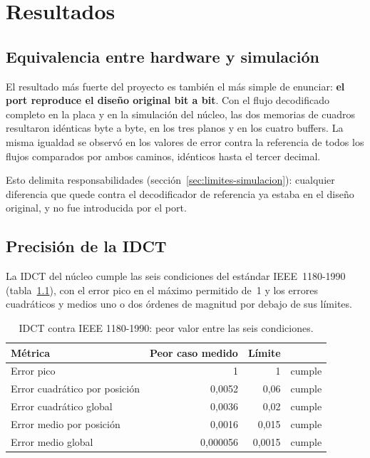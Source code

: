 \chapter{Resultados}
\label{cap:resultados}

\section{Equivalencia entre hardware y simulación}

El resultado más fuerte del proyecto es también el más simple de enunciar:
\textbf{el port reproduce el diseño original bit a bit}. Con el flujo
 decodificado completo en la placa y en la simulación del
núcleo, las dos memorias de cuadros resultaron idénticas byte a byte, en los
tres planos y en los cuatro buffers. La misma igualdad se observó en los
valores de error contra la referencia de todos los flujos comparados por
ambos caminos, idénticos hasta el tercer decimal.

Esto delimita responsabilidades (sección~\ref{sec:limites-simulacion}):
cualquier diferencia que quede contra el decodificador de referencia ya
estaba en el diseño original, y no fue introducida por el port.

\section{Precisión de la IDCT}

La IDCT del núcleo cumple las seis condiciones del estándar IEEE~1180-1990
(tabla~\ref{tab:ieee1180}), con el error pico en el máximo permitido de~1 y
los errores cuadráticos y medios uno o dos órdenes de magnitud por debajo de
sus límites.

\begin{table}[ht]
  \centering\small
  \begin{tabular}{@{}l r r r@{}}
    \toprule
    \textbf{Métrica} & \textbf{Peor caso medido} & \textbf{Límite} & \\
    \midrule
    Error pico                       & 1        & 1      & cumple \\
    Error cuadrático por posición    & 0,0052   & 0,06   & cumple \\
    Error cuadrático global          & 0,0036   & 0,02   & cumple \\
    Error medio por posición         & 0,0016   & 0,015  & cumple \\
    Error medio global               & 0,000056 & 0,0015 & cumple \\
    \bottomrule
  \end{tabular}
  \caption{IDCT contra IEEE 1180-1990: peor valor entre las seis
    condiciones.}
  \label{tab:ieee1180}
\end{table}

